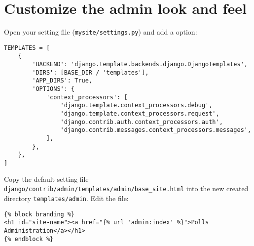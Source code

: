 \section{Customize the admin look and feel}

Open your setting file (\verb|mysite/settings.py|) and add a  option:

\begin{lstlisting}
TEMPLATES = [
    {
        'BACKEND': 'django.template.backends.django.DjangoTemplates',
        'DIRS': [BASE_DIR / 'templates'],
        'APP_DIRS': True,
        'OPTIONS': {
            'context_processors': [
                'django.template.context_processors.debug',
                'django.template.context_processors.request',
                'django.contrib.auth.context_processors.auth',
                'django.contrib.messages.context_processors.messages',
            ],
        },
    },
]
\end{lstlisting}




Copy the default setting file \\
\verb|django/contrib/admin/templates/admin/base_site.html| into the new created directory \verb|templates/admin|.
Edit the file:
\lstset{language=html}
\begin{lstlisting}
{% block branding %}
<h1 id="site-name"><a href="{% url 'admin:index' %}">Polls Administration</a></h1>
{% endblock %}
  
\end{lstlisting}


